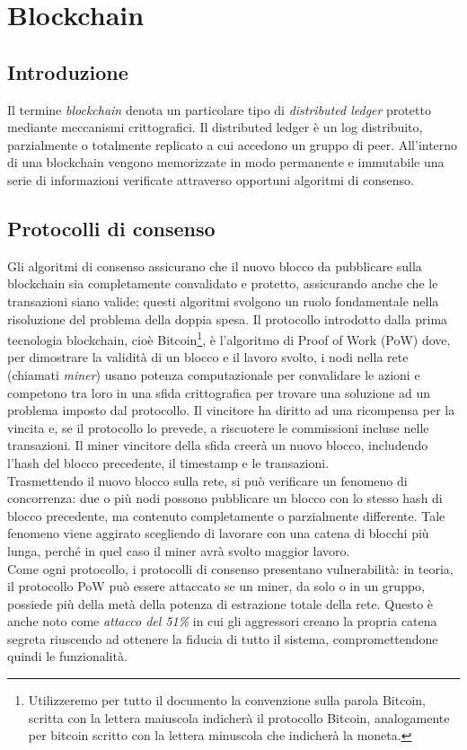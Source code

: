 \chapter{Blockchain}
\label{chap:blockchain}

\section{Introduzione}
\label{sec:introduzione}

Il termine \emph{blockchain} denota un particolare tipo di \emph{distributed ledger} protetto mediante meccanismi crittografici.
Il distributed ledger è un log distribuito, parzialmente o totalmente replicato a cui accedono un gruppo di peer.
All’interno di una blockchain vengono memorizzate in modo permanente e immutabile una serie di informazioni verificate attraverso opportuni algoritmi di consenso.


\section{Protocolli di consenso}
\label{sec:protocolloDiConsenso}

Gli algoritmi di consenso assicurano che il nuovo blocco da pubblicare sulla blockchain sia completamente convalidato e protetto, assicurando anche che le transazioni siano valide; questi algoritmi svolgono un ruolo fondamentale nella risoluzione del problema della doppia spesa.
Il protocollo introdotto dalla prima tecnologia blockchain, cioè Bitcoin\footnote{Utilizzeremo per tutto il documento la convenzione sulla parola Bitcoin, scritta con la lettera maiuscola indicherà il protocollo Bitcoin, analogamente per bitcoin scritto con la lettera minuscola che indicherà la moneta.}, è l’algoritmo di  Proof of Work (PoW) dove, per dimostrare la validità di un blocco e il lavoro svolto, i nodi nella rete (chiamati {\it miner\/}) usano potenza computazionale per convalidare le azioni e competono tra loro in una sfida crittografica per trovare una soluzione ad un problema imposto dal protocollo.
Il vincitore ha diritto ad una ricompensa per la vincita e, se il protocollo lo prevede, a riscuotere le commissioni incluse nelle transazioni.
Il miner vincitore della sfida creerà un nuovo blocco, includendo l’hash del blocco precedente, il timestamp e le transazioni. \\
Trasmettendo il nuovo blocco sulla rete, si può verificare un fenomeno di concorrenza: due o più nodi possono pubblicare un blocco con lo stesso hash di blocco precedente, ma contenuto completamente o parzialmente differente. Tale fenomeno viene aggirato scegliendo di lavorare con una catena di blocchi più lunga, perché in quel caso il miner avrà svolto maggior lavoro. \\
Come ogni protocollo, i protocolli di consenso presentano vulnerabilità: in teoria, il protocollo PoW può essere attaccato se un miner, da solo o in un gruppo, possiede più della metà della potenza di estrazione totale della rete. Questo è anche noto come \emph{attacco del 51\%} in cui gli aggressori creano la propria catena segreta riuscendo ad ottenere la fiducia di tutto il sistema, compromettendone quindi le funzionalità.


